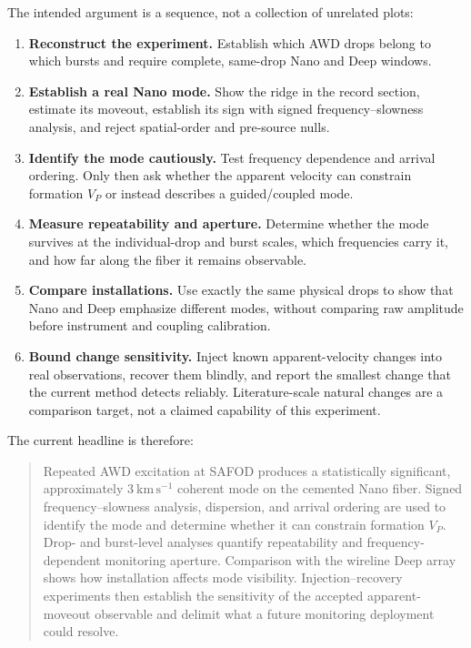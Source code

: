 \documentclass[11pt]{article}
\begin{document}
The intended argument is a sequence, not a collection of unrelated plots:

\begin{enumerate}[leftmargin=*,label=\arabic*.]
  \item \textbf{Reconstruct the experiment.} Establish which AWD drops belong
  to which bursts and require complete, same-drop Nano and Deep windows.
  \item \textbf{Establish a real Nano mode.} Show the ridge in the record
  section, estimate its moveout, establish its sign with signed
  frequency--slowness analysis, and reject spatial-order and pre-source nulls.
  \item \textbf{Identify the mode cautiously.} Test frequency dependence and
  arrival ordering.  Only then ask whether the apparent velocity can constrain
  formation $V_P$ or instead describes a guided/coupled mode.
  \item \textbf{Measure repeatability and aperture.} Determine whether the mode
  survives at the individual-drop and burst scales, which frequencies carry it,
  and how far along the fiber it remains observable.
  \item \textbf{Compare installations.} Use exactly the same physical drops to
  show that Nano and Deep emphasize different modes, without comparing raw
  amplitude before instrument and coupling calibration.
  \item \textbf{Bound change sensitivity.} Inject known apparent-velocity
  changes into real observations, recover them blindly, and report the smallest
  change that the current method detects reliably.  Literature-scale natural
  changes are a comparison target, not a claimed capability of this experiment.
\end{enumerate}

The current headline is therefore:
\begin{quote}
Repeated AWD excitation at SAFOD produces a statistically significant,
approximately $3~\mathrm{km\,s^{-1}}$ coherent mode on the cemented Nano fiber.
Signed frequency--slowness analysis, dispersion, and arrival ordering are used
to identify the mode and determine whether it can constrain formation $V_P$.
Drop- and burst-level analyses quantify repeatability and frequency-dependent
monitoring aperture.  Comparison with the wireline Deep array shows how
installation affects mode visibility.  Injection--recovery experiments then
establish the sensitivity of the accepted apparent-moveout observable and
  delimit what a future monitoring deployment could resolve.
\end{quote}
\end{document}
